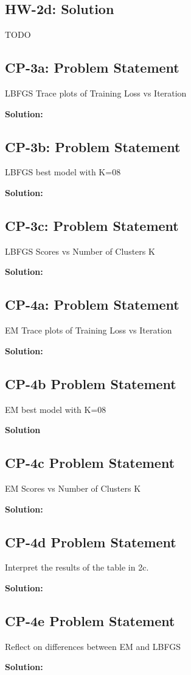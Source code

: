 \documentclass[10pt]{article}
\newcommand{\officialdirections}[1]{{\color{blue} #1}}
\begin{document}
\subsection{HW-2d: Solution}
TODO
\newpage

\officialdirections{
\subsection{CP-3a: Problem Statement}

LBFGS Trace plots of Training Loss vs Iteration}


\textbf{Solution:}


\bigskip
\officialdirections{
\subsection{CP-3b: Problem Statement}

LBFGS best model with K=08
}

\textbf{Solution:}

\bigskip
\officialdirections{
\subsection{CP-3c: Problem Statement}

LBFGS Scores vs Number of Clusters K
}

\textbf{Solution:}

\newpage
\officialdirections{
\subsection{CP-4a: Problem Statement}

EM Trace plots of Training Loss vs Iteration
}

\textbf{Solution:}

\bigskip
\officialdirections{
\subsection{CP-4b Problem Statement}

EM best model with K=08
}

\textbf{Solution}

\bigskip
\officialdirections{
\subsection{CP-4c Problem Statement}

EM Scores vs Number of Clusters K
}

\textbf{Solution:}

\bigskip
\officialdirections{
\subsection{CP-4d Problem Statement}

Interpret the results of the table in 2c.
}

\textbf{Solution:}

\bigskip

\officialdirections{
\subsection{CP-4e Problem Statement}

Reflect on differences between EM and LBFGS
}

\textbf{Solution:}
\end{document}
